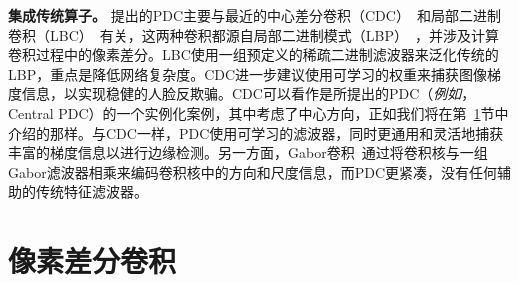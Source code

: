 \documentclass[10pt,twocolumn,letterpaper]{article}
\begin{document}
\vspace{0.3em}
\noindent \textbf{集成传统算子。} \quad 提出的PDC主要与最近的中心差分卷积（CDC）~\cite{yu2020cdc, yu2020fas, yu2021dual, yu2021searching}和局部二进制卷积（LBC）~\cite{juefei2017lbc}有关，这两种卷积都源自局部二进制模式（LBP）~\cite{ojala2002lbp}，并涉及计算卷积过程中的像素差分。LBC使用一组预定义的稀疏二进制滤波器来泛化传统的LBP，重点是降低网络复杂度。CDC进一步建议使用可学习的权重来捕获图像梯度信息，以实现稳健的人脸反欺骗。CDC可以看作是所提出的PDC（\emph{例如}，Central PDC）的一个实例化案例，其中考虑了中心方向，正如我们将在第~\ref{sec:pdc}节中介绍的那样。与CDC一样，PDC使用可学习的滤波器，同时更通用和灵活地捕获丰富的梯度信息以进行边缘检测。另一方面，Gabor卷积~\cite{luan2018gabor}通过将卷积核与一组Gabor滤波器相乘来编码卷积核中的方向和尺度信息，而PDC更紧凑，没有任何辅助的传统特征滤波器。


\section{像素差分卷积}
\label{sec:pdc}
\end{document}
